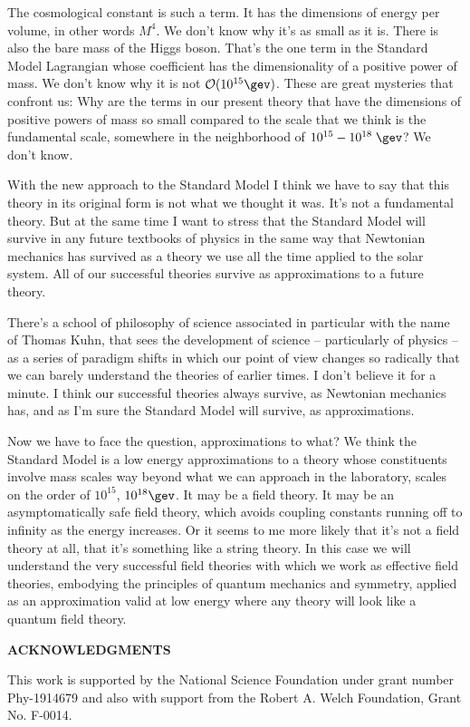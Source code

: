 The cosmological constant is such a term. It has the dimensions of energy per volume, in other words $M^4$. We don't know why it's as small as it is.  There is also the bare mass of the Higgs boson. That's the one  term in the Standard Model Lagrangian whose  coefficient has the dimensionality of a positive power of mass. We don't know why it is not ${\cal O}(10^{15}\gev)$. These are  great mysteries that confront us: Why are the terms in our present theory that have the dimensions of positive powers of mass so small compared to the scale that we think is the fundamental scale, somewhere in the neighborhood of $10^{15}-10^{18}\;\gev$? We don't know. 

With the new approach to the Standard Model I think we have to say that this theory in its original form is not what we thought it was. It's not a fundamental theory. But at the same time I want to stress that the Standard Model will survive in any future textbooks of physics in the same way that Newtonian mechanics has survived as  a theory we use all the time applied to the solar system. All of our successful theories survive as approximations to a future theory. 

There's a school of philosophy of science associated in particular with the name of Thomas Kuhn, that sees the development of science -- particularly of physics -- as a series of paradigm shifts in which our point of view changes so radically that we can barely understand the theories of earlier times. I don't believe it for a minute.  I think our successful theories always survive, as Newtonian mechanics has, and as I'm sure the Standard Model will survive, as approximations. 

Now we have to face the question, approximations to what?  We think the Standard Model is a low energy approximations to a theory whose constituents involve mass scales way beyond what we can approach in the laboratory, scales on the order of $10^{15}$, $10^{18}\gev$. It may be a field theory. It may be an asymptomatically safe field theory, which avoids coupling constants running off to infinity as the energy increases. Or it seems to me more likely that it's not a field theory at all, that it's something like a string theory.  In this case we will understand the very successful field theories with which we work as effective field theories, embodying the principles of quantum mechanics and symmetry, applied as an approximation valid at low energy  where any theory will look like a quantum field theory. 

\vspace{10pt}

\vspace{10pt}

\begin{center}
{\bf 	ACKNOWLEDGMENTS}
\end{center}

This work  is supported by the National Science Foundation under grant number
Phy-1914679 and also with support from the Robert A. Welch Foundation, Grant No. F-0014. 


